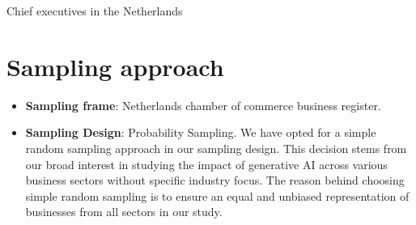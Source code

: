 \documentclass[UTF8,a4paper,AutoFakeBold,AutoFakeSlant]{article}
\begin{document}
Chief executives in the Netherlands


\section{Sampling approach}

\begin{itemize}
    \item \textbf{Sampling frame}: Netherlands chamber of commerce business register.
    \item \textbf{Sampling Design}: Probability Sampling. We have opted for a simple random sampling approach in our sampling design. This decision stems from our broad interest in studying the impact of generative AI across various business sectors without specific industry focus. The reason behind choosing simple random sampling is to ensure an equal and unbiased representation of businesses from all sectors in our study.
\end{itemize}





% 
% 
% 
\end{document}

